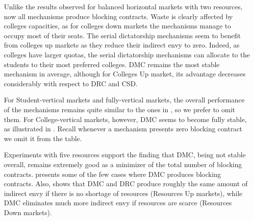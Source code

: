 \begin{table}[ht]
{\begin{tabular}{cccccc}
\toprule
\end{tabular}
\label{tab:blocking_contracts_two_resources_unbalanced_horizontal_market}
}
\end{table}

Unlike the results observed for balanced horizontal markets with two resources, now all mechanisms produce blocking contracts. Waste is clearly affected by colleges capacities, as for colleges down markets the mechanisms manage to occupy most of their seats. The serial dictatorship mechanisms seem to benefit from colleges up markets as they reduce their indirect envy to zero. Indeed, as colleges have larger quotas, the serial dictatorship mechanisms can allocate to the students to their most preferred colleges. DMC remains the most stable mechanism in average, although for Colleges Up market, its advantage decreases considerably with respect to DRC and CSD.

For Student-vertical markets and fully-vertical markets, the overall performance of the mechanisms remains quite similar to the ones in , so we prefer to omit them. For College-vertical markets, however, DMC seems to become fully stable, as illustrated in . Recall whenever a mechanism presents zero blocking contract we omit it from the table.

Experiments with five resources support the finding that DMC, being not stable overall, remains extremely good as a minimizer of the total number of blocking contracts.  presents some of the few cases where DMC produces blocking contracts. Also,  shows that DMC and DRC produce roughly the same amount of indirect envy if there is no shortage of resources (Resources Up markets), while DMC eliminates much more indirect envy if resources are scarce (Resources Down markets).

